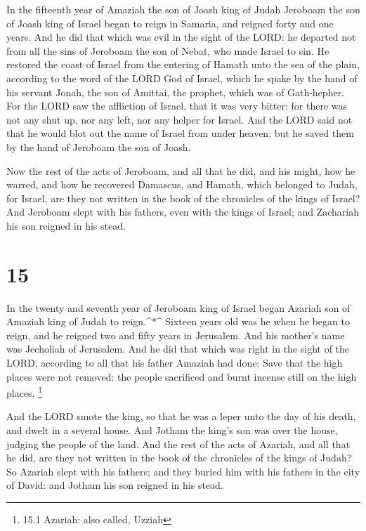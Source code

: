  In the fifteenth year of Amaziah the son of Joash king of
Judah Jeroboam the son of Joash king of Israel began to reign in
Samaria, and reigned forty and one years.  And he did that
which was evil in the sight of the LORD: he departed not from all the
sins of Jeroboam the son of Nebat, who made Israel to sin. 
He restored the coast of Israel from the entering of Hamath unto the sea
of the plain, according to the word of the LORD God of Israel, which he
spake by the hand of his servant Jonah, the son of Amittai, the prophet,
which was of Gath-hepher.  For the LORD saw the affliction
of Israel, that it was very bitter: for there was not any shut up, nor
any left, nor any helper for Israel.  And the LORD said not
that he would blot out the name of Israel from under heaven: but he
saved them by the hand of Jeroboam the son of Joash.

 Now the rest of the acts of Jeroboam, and all that he did,
and his might, how he warred, and how he recovered Damascus, and Hamath,
which belonged to Judah, for Israel, are they not written in the book of
the chronicles of the kings of Israel?  And Jeroboam slept
with his fathers, even with the kings of Israel; and Zachariah his son
reigned in his stead.

\hypertarget{section-14}{%
\section{15}\label{section-14}}

 In the twenty and seventh year of Jeroboam king of Israel
began Azariah son of Amaziah king of Judah to reign.\^{}*\^{}
 Sixteen years old was he when he began to reign, and he
reigned two and fifty years in Jerusalem. And his mother's name was
Jecholiah of Jerusalem.  And he did that which was right in
the sight of the LORD, according to all that his father Amaziah had
done;  Save that the high places were not removed: the
people sacrificed and burnt incense still on the high places.
\footnote{15.1 Azariah: also called, Uzziah}

 And the LORD smote the king, so that he was a leper unto
the day of his death, and dwelt in a several house. And Jotham the
king's son was over the house, judging the people of the land.
 And the rest of the acts of Azariah, and all that he did,
are they not written in the book of the chronicles of the kings of
Judah?  So Azariah slept with his fathers; and they buried
him with his fathers in the city of David: and Jotham his son reigned in
his stead.

